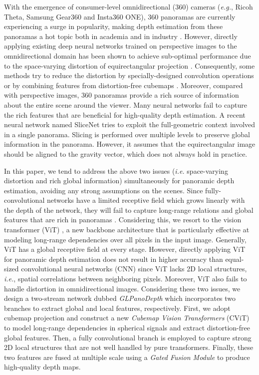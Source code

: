 \documentclass[10pt,twocolumn,letterpaper]{article}
\begin{document}
With the emergence of consumer-level omnidirectional (360) cameras (\emph{e.g.}, Ricoh Theta, Samsung Gear360 and Insta360 ONE), 360 panoramas are currently experiencing a surge in popularity, making depth estimation from these panoramas a hot topic both in academia and in industry \cite{3D60,8885706,8885718,9157424,9157410,10.1007/978-3-030-58517-4_39,Wang_2019_ICRA,9320332,9353978,Sun_2021_CVPR,Pintore_2021_CVPR}. However, directly applying existing deep neural networks trained on perspective images to the omnidirectional domain has been shown to achieve sub-optimal performance due to the space-varying distortion of equirectangular projection \cite{10.1007/978-3-030-01270-0_43,3D60}. Consequently, 
some methods try to reduce the distortion by specially-designed convolution operations \cite{10.1007/978-3-030-01270-0_43} or by combining features from distortion-free cubemaps \cite{9157424,9353978}. Moreover, compared with perspective images, 360 panoramas provide a rich source of information about the entire scene around the viewer. Many neural networks fail to capture the rich features \cite{10.1007/978-3-319-10599-4_43} that are beneficial for high-quality depth estimation. A recent neural network named SliceNet \cite{Pintore_2021_CVPR} tries to exploit the full-geometric context involved in a single panorama. Slicing is performed over multiple levels to preserve global information in the panorama. However, it assumes that the equirectangular image should be aligned to the gravity vector, which does not always hold in practice.

In this paper, we tend to address the above two issues (\emph{i.e.} space-varying distortion and rich global information) simultaneously for panoramic depth estimation, avoiding any strong assumptions on the scenes. Since fully-convolutional networks have a limited receptive field which grows linearly with the depth of the network, they will fail to capture long-range relations and global features that are rich in panoramas \cite{10.1007/978-3-319-10599-4_43}. Considering this, we resort to the vision transformer (ViT) \cite{vit}, a new backbone architecture that is particularly effective at modeling long-range dependencies over all pixels in the input image. Generally, ViT has a global receptive field at every stage. However, directly applying ViT for panoramic depth estimation does not result in higher accuracy than equal-sized convolutional neural networks (CNN) since ViT lacks 2D local structures, \emph{i.e.}, spatial correlations between neighboring pixels. Moreover, ViT also fails to handle distortion in omnidirectional images. Considering these two issues, we design a two-stream network dubbed \emph{GLPanoDepth} which incorporates two branches to extract global and local features, respectively. First, we adopt cubemap projection and construct a new \emph{Cubemap Vision Transformers} (CViT) to model long-range dependencies in spherical signals and extract distortion-free global features. Then, a fully convolutional branch is employed to capture strong 2D local structures that are not well handled by pure transformers. Finally, these two features are fused at multiple scale using a \emph{Gated Fusion Module} to produce high-quality depth maps. 
\end{document}
